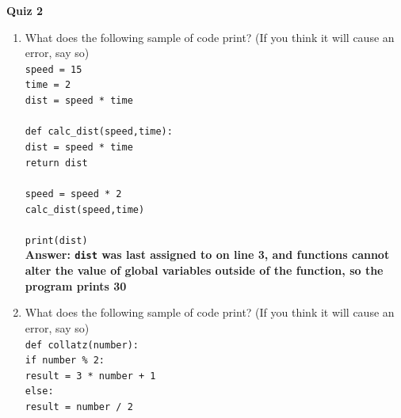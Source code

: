 \documentclass{article}
\begin{document}
\fancyfoot[C]{\thepage}
\vspace*{0cm}
\begin{center}
	{\LARGE \textbf{Quiz 2}}\\
	\vspace{.25cm}
\end{center}

\begin{enumerate}
	\item What does the following sample of code print? (If you think it will cause an error, say so)\\ \texttt{speed = 15}\\
	\texttt{time = 2}\\
	\texttt{dist = speed * time}\\
	\texttt{}\\
	\texttt{def calc\_dist(speed,time):}\\
	\null\quad\quad\texttt{dist = speed * time}\\
	\null\quad\quad\texttt{return dist}\\
	\texttt{}\\
	\texttt{speed = speed * 2}\\
	\texttt{calc\_dist(speed,time)}\\
	\texttt{}\\
	\texttt{print(dist)}\\
	{\bfseries \color{ForestGreen} Answer: \texttt{dist} was last assigned to on line 3, and functions cannot alter the value of global variables outside of the function, so the program prints 30}
	\item What does the following sample of code print? (If you think it will cause an error, say so)\\ 
\texttt{def collatz(number):}\\
\null\quad\quad\texttt{if number \% 2:}\\
	\null\quad\quad\quad\quad\texttt{result = 3 * number + 1}\\
	\null\quad\quad\texttt{else:}\\
	\null\quad\quad\quad\quad\texttt{result = number / 2}\\

\end{enumerate}
\end{document}
